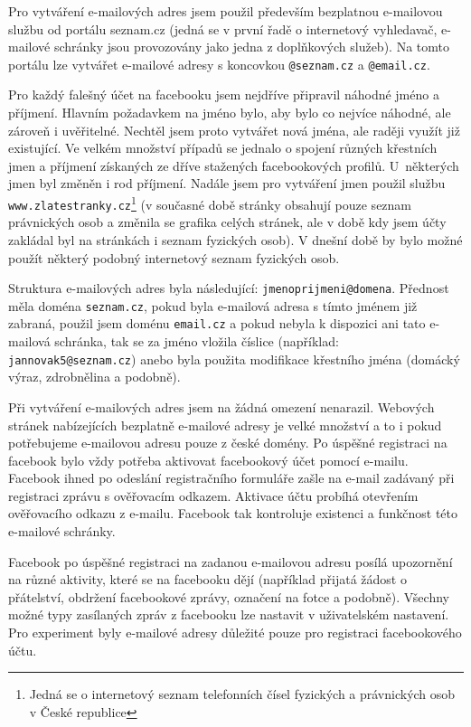 \documentclass[thesis=M,czech]{FITthesis}[2013/05/10]
\begin{document}
Pro vytváření e-mailových adres jsem použil především bezplatnou e-mailovou službu od portálu seznam.cz (jedná se v první řadě o internetový vyhledavač, e-mailové schránky jsou provozovány jako jedna z doplňkových služeb). Na tomto portálu lze vytvářet e-mailové adresy s koncovkou \verb|@seznam.cz| a \verb|@email.cz|.

Pro každý falešný účet na facebooku jsem nejdříve připravil náhodné jméno a příjmení. Hlavním požadavkem na jméno bylo, aby bylo co nejvíce náhodné, ale zároveň i uvěřitelné. Nechtěl jsem proto vytvářet nová jména, ale raději využít již existující. Ve velkém množství případů se jednalo o spojení různých křestních jmen a příjmení získaných ze dříve stažených facebookových profilů. U~některých jmen byl změněn i rod příjmení. Nadále jsem pro vytváření jmen použil službu \verb|www.zlatestranky.cz|\footnote{Jedná se o internetový seznam telefonních čísel fyzických a právnických osob v České republice} (v současné době stránky obsahují pouze seznam právnických osob a změnila se grafika celých stránek, ale v době kdy jsem účty zakládal byl na stránkách i seznam fyzických osob). V dnešní době by bylo možné použít některý podobný internetový seznam fyzických osob.

Struktura e-mailových adres byla následující: \verb|jmenoprijmeni@domena|. Přednost měla doména \verb|seznam.cz|, pokud byla e-mailová adresa s tímto jménem již zabraná, použil jsem doménu \verb|email.cz| a pokud nebyla k dispozici ani tato e-mailová schránka, tak se za jméno vložila číslice (například: \verb|jannovak5@seznam.cz|) anebo byla použita modifikace křestního jména (domácký výraz, zdrobnělina a podobně).

Při vytváření e-mailových adres jsem na žádná omezení nenarazil. Webových stránek nabízejících bezplatně e-mailové adresy je velké množství a to i pokud potřebujeme e-mailovou adresu pouze z české domény. Po úspěšné registraci na facebook bylo vždy potřeba aktivovat facebookový účet pomocí e-mailu. Facebook ihned po odeslání registračního formuláře zašle na e-mail zadávaný při registraci zprávu s ověřovacím odkazem. Aktivace účtu probíhá otevřením ověřovacího odkazu z e-mailu. Facebook tak kontroluje existenci a funkčnost této e-mailové schránky.

Facebook po úspěšné registraci na zadanou e-mailovou adresu posílá upozornění na různé aktivity, které se na facebooku dějí (například přijatá žádost o přátelství, obdržení facebookové zprávy, označení na fotce a podobně). Všechny možné typy zasílaných zpráv z facebooku lze nastavit v uživatelském nastavení. Pro experiment byly e-mailové adresy důležité pouze pro registraci facebookového účtu.
\end{document}
